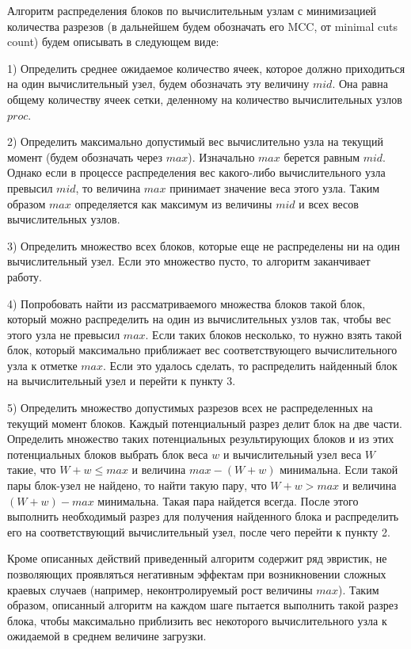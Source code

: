 Алгоритм распределения блоков по вычислительным узлам с минимизацией количества разрезов (в дальнейшем будем обозначать его MCC, от minimal cuts count\label{abbr:mcc}) будем описывать в следующем виде:

1) Определить среднее ожидаемое количество ячеек, которое должно приходиться на один вычислительный узел, будем обозначать эту величину $mid$.
Она равна общему количеству ячеек сетки, деленному на количество вычислительных узлов $proc$.

2) Определить максимально допустимый вес вычислительно узла на текущий момент (будем обозначать через $max$).
Изначально $max$ берется равным $mid$.
Однако если в процессе распределения вес какого-либо вычислительного узла превысил $mid$, то величина $max$ принимает значение веса этого узла.
Таким образом $max$ определяется как максимум из величины $mid$ и всех весов вычислительных узлов.

3) Определить множество всех блоков, которые еще не распределены ни на один вычислительный узел.
Если это множество пусто, то алгоритм заканчивает работу.

4) Попробовать найти из рассматриваемого множества блоков такой блок, который можно распределить на один из вычислительных узлов так, чтобы вес этого узла не превысил $max$.
Если таких блоков несколько, то нужно взять такой блок, который максимально приближает вес соответствующего вычислительного узла к отметке $max$.
Если это удалось сделать, то распределить найденный блок на вычислительный узел и перейти к пункту 3.

5) Определить множество допустимых разрезов всех не распределенных на текущий момент блоков.
Каждый потенциальный разрез делит блок на две части.
Определить множество таких потенциальных результирующих блоков и из этих потенциальных блоков выбрать блок веса $w$ и вычислительный узел веса $W$ такие, что $W + w \le max$ и величина $max - (W + w)$ минимальна.
Если такой пары блок-узел не найдено, то найти такую пару, что $W + w > max$ и величина $(W + w) - max$ минимальна.
Такая пара найдется всегда.
После этого выполнить необходимый разрез для получения найденного блока и распределить его на соответствующий вычислительный узел, после чего перейти к пункту 2.

Кроме описанных действий приведенный алгоритм содержит ряд эвристик, не позволяющих проявляться негативным эффектам при возникновении сложных краевых случаев (например, неконтролируемый рост величины $max$). 
Таким образом, описанный  алгоритм на каждом шаге пытается выполнить такой разрез блока, чтобы максимально приблизить вес некоторого вычислительного узла к ожидаемой в среднем величине загрузки.

